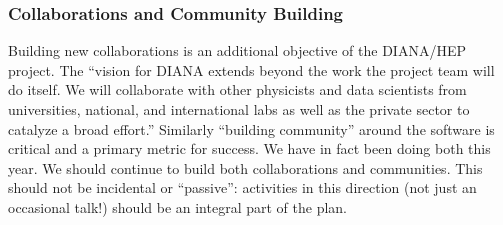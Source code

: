 \begin{frame}
\frametitle{Collaborations and Community Building}

Building new collaborations is an additional objective of the DIANA/HEP 
project. The ``vision for DIANA extends beyond the work the project team will 
do itself.  We will collaborate with other physicists and data scientists
from universities, national, and international labs as well as the private 
sector to catalyze a broad effort.''
\vskip 0.15in
Similarly ``building community'' around the software is critical and a primary metric for success. 
\vskip 0.15in
We have in fact been doing both this year. We should continue to build both collaborations and communities. This should not be incidental or ``passive'': activities in this direction (not just an occasional talk!) should be an integral part of the plan.
\end{frame}


